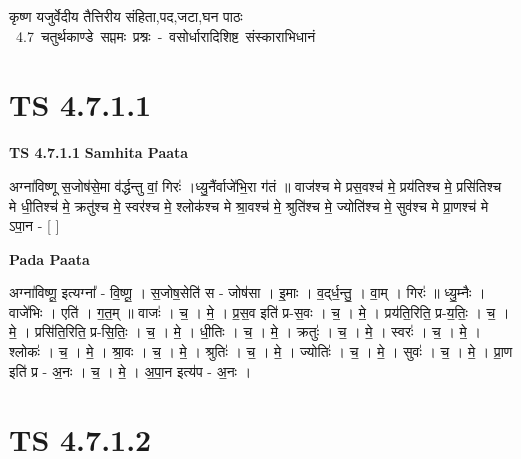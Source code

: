 \documentclass[17pt]{extarticle}
\begin{document}
\begin{titlepage}
    \begin{center}
 
\begin{sanskrit}
    { \Huge
    कृष्ण यजुर्वेदीय तैत्तिरीय संहिता,पद,जटा,घन पाठः 
    }
    \\
    \vspace{2.5cm}
    \mbox{ \Huge
    4.7     चतुर्थकाण्डे सप्तमः प्रश्नः - वसोर्धारादिशिष्ट संस्काराभिधानं   }
\end{sanskrit}
\end{center}

\end{titlepage}
\tableofcontents
\pagebreak

\section*{ TS 4.7.1.1 }

\textbf{TS 4.7.1.1 } \newline
\textbf{Samhita Paata} \newline

अग्ना॑विष्णू स॒जोष॑से॒मा व॑र्द्धन्तु वां॒ गिरः॑ ।ध्यु॒नैंर्वाजे॑भि॒रा ग॑तं ॥ वाज॑श्च मे प्रस॒वश्च॑ मे॒ प्रय॑तिश्च मे॒ प्रसि॑तिश्च मे धी॒तिश्च॑ मे॒ क्रतु॑श्च मे॒ स्वर॑श्च मे॒ श्लोक॑श्च मे श्रा॒वश्च॑ मे॒ श्रुति॑श्च मे॒ ज्योति॑श्च मे॒ सुव॑श्च मे प्रा॒णश्च॑ मे ऽपा॒न - [  ] \newline

\textbf{Pada Paata} \newline

अग्ना॑विष्णू॒ इत्यग्ना᳚ - वि॒ष्णू॒ । स॒जोष॒सेति॑ स - जोष॑सा । इ॒माः । व॒द्‌र्ध॒न्तु॒ । वा॒म् । गिरः॑ ॥ ध्यु॒म्नैः । वाजे॑भिः । एति॑ । ग॒त॒म् ॥ वाजः॑ । च॒ । मे॒ । प्र॒स॒व इति॑ प्र-स॒वः । च॒ । मे॒ । प्रय॑ति॒रिति॒ प्र-य॒तिः॒ । च॒ । मे॒ । प्रसि॑ति॒रिति॒ प्र-सि॒तिः॒ । च॒ । मे॒ । धी॒तिः । च॒ । मे॒ । क्रतुः॑ । च॒ । मे॒ । स्वरः॑ । च॒ । मे॒ । श्लोकः॑ । च॒ । मे॒ । श्रा॒वः । च॒ । मे॒ । श्रुतिः॑ । च॒ । मे॒ । ज्योतिः॑ । च॒ । मे॒ । सुवः॑ । च॒ । मे॒ । प्रा॒ण इति॑ प्र - अ॒नः । च॒ । मे॒ । अ॒पा॒न इत्य॑प - अ॒नः ।  \newline




\section*{ TS 4.7.1.2 }
\end{document}
